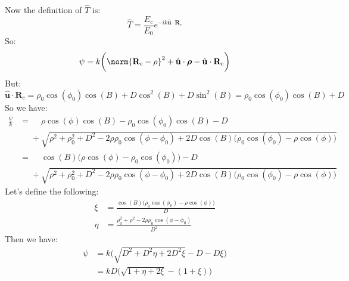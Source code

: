 \documentclass[crop=false,class=book,oneside]{standalone}
\begin{document}
            Now the definition of $\hat{T}$ is:
            \begin{equation*}
            \hat{T} = \frac{E_{c}}{E_{0}}e^{-ik\hat{\mathbf{u}}\cdot\mathbf{R}_{c}}
            \end{equation*}
            So:
            \begin{equation*}
            \psi = k\bigg(\norm{\mathbf{R}_{c}-\rho}^2 + \hat{\mathbf{u}}\cdot\boldsymbol{\rho} - \hat{\mathbf{u}}\cdot \mathbf{R}_{c}\bigg)    
            \end{equation*}
            But:
            \begin{equation*}
            \hat{\mathbf{u}}\cdot \mathbf{R}_{c} = \rho_{0}\cos(\phi_0)\cos(B) + D\cos^2(B) + D\sin^2(B) = \rho_{0}\cos(\phi_0)\cos(B)+D    
            \end{equation*}
            So we have:
            \begin{align*}
            \frac{\psi}{k} &=\phantom{+}\rho\cos(\phi)\cos(B) - \rho_0\cos(\phi_0)\cos(B)-D\\
            &\phantom{=}+\sqrt{\rho^2+\rho_{0}^2 + D^2 - 2\rho\rho_{0}\cos(\phi - \phi_{0}) + 2D\cos(B)\big(\rho_{0}\cos(\phi_0) - \rho\cos(\phi)\big)} \\
            &=\phantom{+}\cos(B)\big(\rho\cos(\phi) - \rho_{0}\cos(\phi_{0})\big) - D\\
            &\phantom{=}+\sqrt{\rho^2+\rho_{0}^2 + D^2 - 2\rho\rho_{0}\cos(\phi - \phi_{0}) + 2D\cos(B)\big(\rho_{0}\cos(\phi_0) - \rho\cos(\phi)\big)}
            \end{align*}
            Let's define the following:
            \begin{align*}
            \xi &= \frac{\cos(B)\big(\rho_{0}\cos(\phi_{0})-\rho\cos(\phi)\big)}{D} \\
            \eta &= \frac{\rho_{0}^2+\rho^2-2\rho\rho_{0}\cos(\phi-\phi_{0})}{D^2}
            \end{align*}
            Then we have:
            \begin{align*}
            \nonumber\psi &= k\big(\sqrt{D^2+D^2\eta + 2D^2\xi}-D-D\xi\big)\\
            &= kD\big(\sqrt{1+\eta+2\xi}-(1+\xi)\big)
            \end{align*}
\end{document}
